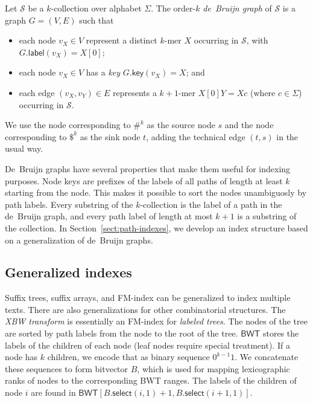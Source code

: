 \documentclass[a4paper,UKenglish]{lipics-v2016}
\newcommand{\select}{\ensuremath{\mathsf{select}}}
\newcommand{\glabel}{\ensuremath{\mathsf{label}}}
\newcommand{\gkey}{\ensuremath{\mathsf{key}}}
\newcommand{\kmer}[1]{$#1$\nobreakdash-mer}
\newcommand{\kcollection}[1]{$#1$\nobreakdash-collection}
\newcommand{\orderk}[1]{order\nobreakdash-$#1$}
\newcommand{\FMindex}{FM\nobreakdash-index}
\newcommand{\BWT}{\ensuremath{\mathsf{BWT}}}
\begin{document}
\begin{definition}
Let $\mathcal{S}$ be a \kcollection{k} over alphabet $\Sigma$. The \orderk{k} \emph{de~Bruijn graph} of $\mathcal{S}$ is a graph $G = (V, E)$ such that
\begin{itemize}
\item each node $v_{X} \in V$ represent a distinct \kmer{k} $X$ occurring in $\mathcal{S}$, with $G.\glabel(v_{X}) = X[0]$;
\item each node $v_{X} \in V$ has a \emph{key} $G.\gkey(v_{X}) = X$; and
\item each edge $(v_{X}, v_{Y}) \in E$ represents a \kmer{k+1} $X[0]Y = Xc$ (where $c \in \Sigma$) occurring in $\mathcal{S}$.
\end{itemize}
We use the node corresponding to $\#^{k}$ as the source node $s$ and the node corresponding to $\$^{k}$ as the sink node $t$, adding the technical edge $(t, s)$ in the usual way.
\end{definition}

De~Bruijn graphs have several properties that make them useful for indexing purposes. Node keys are prefixes of the labels of all paths of length at least $k$ starting from the node. This makes it possible to sort the nodes unambiguosly by path labels. Every substring of the \kcollection{k} is the label of a path in the de~Bruijn graph, and every path label of length at most $k+1$ is a substring of the collection. In Section~\ref{sect:path-indexes}, we develop an index structure based on a generalization of de~Bruijn graphs.

\subsection{Generalized indexes}

Suffix trees, suffix arrays, and \FMindex{} can be generalized to index multiple texts. There are also generalizations for other combinatorial structures. The \emph{XBW transform} \cite{Ferragina2009b} is essentially an \FMindex{} for \emph{labeled trees}. The nodes of the tree are sorted by path labels from the node to the root of the tree. $\BWT$ stores the labels of the children of each node (leaf nodes require special treatment). If a node has $k$ children, we encode that as binary sequence $0^{k-1} 1$. We concatenate these sequences to form bitvector $B$, which is used for mapping lexicographic ranks of nodes to the corresponding BWT ranges. The labels of the children of node $i$ are found in $\BWT[B.\select(i, 1) + 1, B.\select(i + 1, 1)]$.
\end{document}
